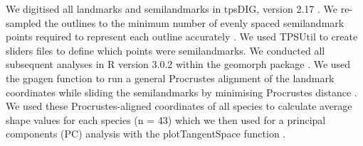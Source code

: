\documentclass[12pt,a4paper]{article}
\begin{document}

	We digitised all landmarks and semilandmarks in tpsDIG, version 2.17 \citep{Rohlf2013}. We re-sampled the outlines to the minimum number of evenly spaced semilandmark points required to represent each outline accurately \citep[][details in supplementary material]{MacLeod2013}. We used TPSUtil \citep{Rohlf2012} to create sliders files \citep{Zelditch2012} to define which points were semilandmarks. We conducted all subsequent analyses in R version 3.0.2 \citep{Team2014} within the geomorph package \citep{Adams2013}. We used the gpagen function to run a general Procrustes alignment \citep{Rohlf1993} of the landmark coordinates while sliding the semilandmarks by minimising Procrustes distance \citep{Bookstein1997}. We used these Procrustes-aligned coordinates of all species to calculate average shape values for each species (n = 43) which we then used for a principal components (PC) analysis with the plotTangentSpace function \citep{Adams2013}. 
\end{document}
